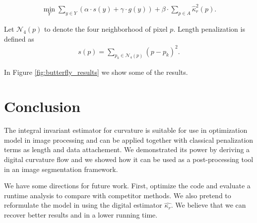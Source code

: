 \documentclass[runningheads]{llncs}
\begin{document}
\begin{align}			
	\min_{Y} \sum_{y \in Y}{\left( \alpha \cdot s(y) + \gamma \cdot g(y) \right)} + \beta \cdot \sum_{p \in A}{\hat{\kappa}_{r}^2(p)}.
	\label{eq:boundary-correction-energy}
\end{align}
	
	Let $\mathcal{N}_4(p)$ to denote the four neighborhood of pixel $p$. Length penalization is defined as
	\begin{align*}
		s(p)=\sum_{p_k \in \mathcal{N}_4(p)}{ (p-p_k) }^2.
	\end{align*}


In Figure \ref{fig:butterfly_results} we show some of the results. 

\section{Conclusion}
The integral invariant estimator for curvature is suitable for use in optimization model in image processing and can be applied together with classical penalization terms as length and data attachement. We demonstrated its power by deriving a digital curvature flow and we showed how it can be used as a post-processing tool in an image segmentation framework. 

We have some directions for future work. First, optimize the code and evaluate a runtime analysis to compare with competitor methods. We also pretend to reformulate the model in \cite{schoenemann09} using the digital estimator $\hat{\kappa_r}$. We believe that we can recover better results and in a lower running time.
	
\end{document}
